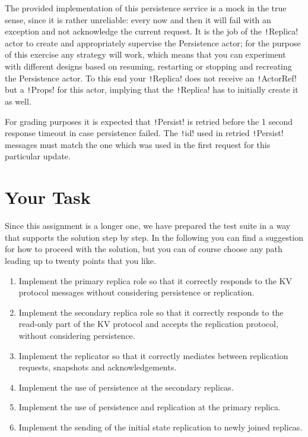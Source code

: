 \documentclass{article}
\begin{document}
The provided implementation of this persistence service is a mock in the true sense, since it is rather unreliable: every now and then it will fail with an exception and not acknowledge the current request. It is the job of the \texttt!Replica! actor to create and appropriately supervise the Persistence actor; for the purpose of this exercise any strategy will work, which means that you can experiment with different designs based on resuming, restarting or stopping and recreating the Persistence actor. To this end your \texttt!Replica! does not receive an \texttt!ActorRef! but a \texttt!Props! for this actor, implying that the \texttt!Replica! has to initially create it as well.

For grading purposes it is expected that \texttt!Persist! is retried before the 1 second response timeout in case persistence failed. The \texttt!id! used in retried \texttt!Persist! messages must match the one which was used in the first request for this particular update.

\section{Your Task}\label{s:yourtask}

Since this assignment is a longer one, we have prepared the test suite in a way that supports the solution step by step. In the following you can find a suggestion for how to proceed with the solution, but you can of course choose any path leading up to twenty points that you like.

\begin{enumerate}
    \item Implement the primary replica role so that it correctly responds to the KV protocol messages without considering persistence or replication.
    \item Implement the secondary replica role so that it correctly responds to the read-only part of the KV protocol and accepts the replication protocol, without considering persistence.
    \item Implement the replicator so that it correctly mediates between replication requests, snapshots and acknowledgements.
    \item Implement the use of persistence at the secondary replicas.
    \item Implement the use of persistence and replication at the primary replica.
    \item Implement the sending of the initial state replication to newly joined replicas.
\end{enumerate}
\end{document}
